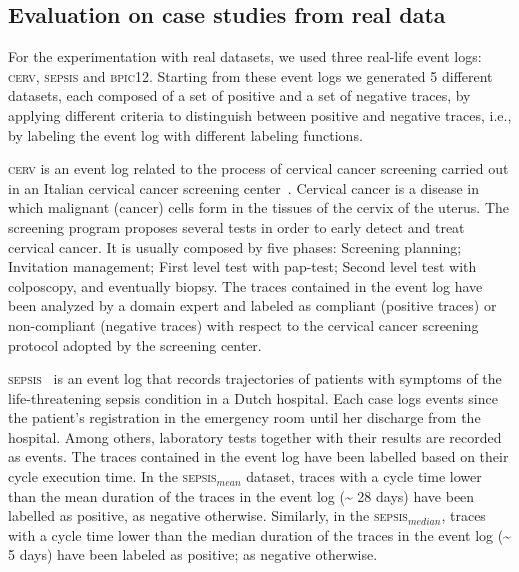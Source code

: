 \subsection{Evaluation on case studies from real data}
\label{sec:realdata}


For the experimentation with real datasets, we used three real-life event logs: \textsc{cerv}, \textsc{sepsis} and \textsc{bpic12}. Starting from these event logs we generated 5 different datasets, each composed of a set of positive and a set of negative traces, by applying different criteria to distinguish between positive and negative traces, i.e., by labeling the event log with different labeling functions. 

\textsc{cerv} is an event log related to the process of cervical cancer screening carried out in an Italian cervical cancer screening center~\cite{2007b-Lamma}. Cervical cancer is a disease in which malignant (cancer) cells form in the tissues of the cervix of the uterus. The screening program proposes several tests in order to early detect and treat cervical cancer. It is usually composed by five phases: Screening planning; Invitation management; First level test with pap-test; Second level test with colposcopy, and eventually biopsy. The traces contained in the event log have been analyzed by a domain expert and labeled as compliant (positive traces) or non-compliant (negative traces) with respect to the cervical cancer screening protocol adopted by the screening center.

\textsc{sepsis}~\cite{Sepsis} is an event log that records trajectories of patients with symptoms of the life-threatening sepsis condition in a Dutch hospital.
Each case logs events since the patient's registration in the emergency room until her discharge from the hospital. Among others, laboratory tests together with their results are recorded as events. The traces contained in the event log have been labelled based on their cycle execution time. In the \textsc{sepsis$_{mean}$} dataset, traces with a cycle time lower than the mean duration of the traces in the event log (\textasciitilde\xspace28 days) have been labelled as positive, as negative otherwise. Similarly, in the \textsc{sepsis$_{median}$}, traces with a cycle time lower than the median duration of the traces in the event log (\textasciitilde\xspace 5 days)  have been labeled as positive; as negative otherwise.  

